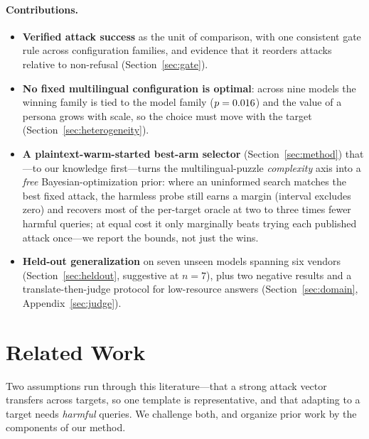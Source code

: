 \documentclass{article}
\begin{document}
\paragraph{Contributions.}
\begin{itemize}
\item \textbf{Verified attack success} as the unit of comparison, with one consistent gate rule across
configuration families, and evidence that it reorders attacks relative to non-refusal
(Section~\ref{sec:gate}).
\item \textbf{No fixed multilingual configuration is optimal}: across nine models the winning family
is tied to the model family ($p=0.016{}$) and the value of a persona grows with scale, so the
choice must move with the target (Section~\ref{sec:heterogeneity}).
\item \textbf{A plaintext-warm-started best-arm selector} (Section~\ref{sec:method}) that---to our knowledge first---turns the multilingual-puzzle \emph{complexity} axis into a \emph{free} Bayesian-optimization prior: where an uninformed search matches the best fixed attack, the harmless probe still earns a margin (interval excludes zero) and recovers most of the per-target oracle at two to three times fewer harmful queries; at equal cost it only marginally beats trying each published attack once---we report the bounds, not just the wins.
\item \textbf{Held-out generalization} on seven unseen models spanning six vendors
(Section~\ref{sec:heldout}, suggestive at $n{=}7$), plus two negative results and a
translate-then-judge protocol for low-resource answers (Section~\ref{sec:domain}, Appendix~\ref{sec:judge}).
\end{itemize}

\section{Related Work}
Two assumptions run through this literature---that a strong attack vector transfers across targets, so one template is representative, and that adapting to a target needs \emph{harmful} queries. We challenge both, and organize prior work by the components of our method.
\end{document}
